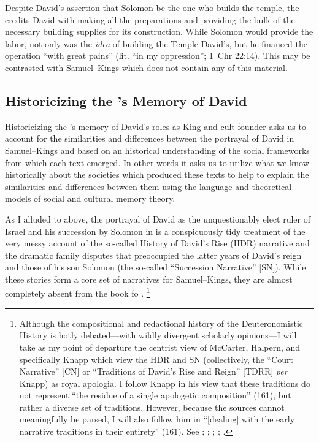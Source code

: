 Despite David's assertion that Solomon be the one who builds the temple, the \chronicler credits David with making all the preparations and providing the bulk of the necessary building supplies for its construction. 
While Solomon would provide the labor, not only was the \emph{idea} of building the Temple David's, but he financed the operation  ``with great pains'' (lit. ``in my oppression''; 1~Chr 22:14). This may be contrasted with Samuel--Kings which does not contain any of this material. 

\subsection{Historicizing the \chronicler's Memory of David}

Historicizing the \chronicler's memory of David's roles as King and cult-founder asks us to account for the similarities and differences between the portrayal of David in Samuel--Kings and \chronicles based on an historical understanding of the social frameworks from which each text emerged. In other words it asks us to utilize what we know historically about the societies which produced these texts to help to explain the similarities and differences between them using the language and theoretical models of social and cultural memory theory.

As I alluded to above, the portrayal of David as the unquestionably elect ruler of Israel and his succession by Solomon in \chronicles is a conspicuously tidy treatment of the very messy account of the so-called History of David's Rise (HDR) narrative and the dramatic family disputes that preoccupied the latter years of David's reign and those of his son Solomon (the so-called ``Succession Narrative'' [SN]). While these stories form a core set of narratives for Samuel--Kings, they are almost completely absent from the book fo \chronicles.%
    \footnote{Although the compositional and redactional history of the Deuteronomistic History is hotly debated---with wildly divergent scholarly opinions---I will take as my point of departure the centrist view of McCarter, Halpern, and specifically Knapp which view the HDR and SN (collectively, the ``Court Narrative'' [CN] or ``Traditions of David's Rise and Reign'' [TDRR] \emph{per} Knapp) as royal apologia. I follow Knapp in his view that these traditions do not represent ``the residue of a single apologetic composition'' (161), but rather a diverse set of traditions. However, because the sources cannot meaningfully be parsed, I will also follow him in ``[dealing] with the early narrative traditions in their entirety'' (161). See 
        \cite{knapp2015};
        \cite{mccarter_interpretation1981};
        \cite{mccarter_jbl1980};
        \cite{mccarter1980};
        \cite{halpern2001}.}

